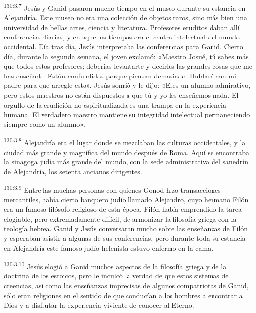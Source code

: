 \par 
\textsuperscript{130:3.7} Jesús y Ganid pasaron mucho tiempo en el museo durante su estancia en Alejandría. Este museo no era una colección de objetos raros, sino más bien una universidad de bellas artes, ciencia y literatura. Profesores eruditos daban allí conferencias diarias, y en aquellos tiempos era el centro intelectual del mundo occidental. Día tras día, Jesús interpretaba las conferencias para Ganid. Cierto día, durante la segunda semana, el joven exclamó: «Maestro Josué, tú sabes más que todos estos profesores; deberías levantarte y decirles las grandes cosas que me has enseñado. Están confundidos porque piensan demasiado. Hablaré con mi padre para que arregle esto». Jesús sonrió y le dijo: «Eres un alumno admirativo, pero estos maestros no están dispuestos a que tú y yo les enseñemos nada. El orgullo de la erudición no espiritualizada es una trampa en la experiencia humana. El verdadero maestro mantiene su integridad intelectual permaneciendo siempre como un alumno».

\par 
\textsuperscript{130:3.8} Alejandría era el lugar donde se mezclaban las culturas occidentales, y la ciudad más grande y magnífica del mundo después de Roma. Aquí se encontraba la sinagoga judía más grande del mundo, con la sede administrativa del sanedrín de Alejandría, los setenta ancianos dirigentes.

\par 
\textsuperscript{130:3.9} Entre las muchas personas con quienes Gonod hizo transacciones mercantiles, había cierto banquero judío llamado Alejandro, cuyo hermano Filón era un famoso filósofo religioso de esta época. Filón había emprendido la tarea elogiable, pero extremadamente difícil, de armonizar la filosofía griega con la teología hebrea. Ganid y Jesús conversaron mucho sobre las enseñanzas de Filón y esperaban asistir a algunas de sus conferencias, pero durante toda su estancia en Alejandría este famoso judío helenista estuvo enfermo en la cama.

\par 
\textsuperscript{130:3.10} Jesús elogió a Ganid muchos aspectos de la filosofía griega y de la doctrina de los estoicos, pero le inculcó la verdad de que estos sistemas de creencias, así como las enseñanzas imprecisas de algunos compatriotas de Ganid, sólo eran religiones en el sentido de que conducían a los hombres a encontrar a Dios y a disfrutar la experiencia viviente de conocer al Eterno.

